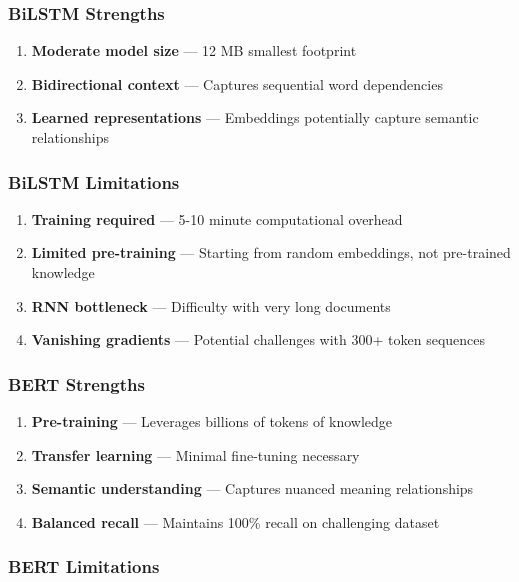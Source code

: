 \subsubsection{BiLSTM Strengths}

\begin{enumerate}
  \item \textbf{Moderate model size} --- 12 MB smallest footprint
  \item \textbf{Bidirectional context} --- Captures sequential word dependencies
  \item \textbf{Learned representations} --- Embeddings potentially capture semantic relationships
\end{enumerate}

\subsubsection{BiLSTM Limitations}

\begin{enumerate}
  \item \textbf{Training required} --- 5-10 minute computational overhead
  \item \textbf{Limited pre-training} --- Starting from random embeddings, not pre-trained knowledge
  \item \textbf{RNN bottleneck} --- Difficulty with very long documents
  \item \textbf{Vanishing gradients} --- Potential challenges with 300+ token sequences
\end{enumerate}

\subsubsection{BERT Strengths}

\begin{enumerate}
  \item \textbf{Pre-training} --- Leverages billions of tokens of knowledge
  \item \textbf{Transfer learning} --- Minimal fine-tuning necessary
  \item \textbf{Semantic understanding} --- Captures nuanced meaning relationships
  \item \textbf{Balanced recall} --- Maintains 100\% recall on challenging dataset
\end{enumerate}

\subsubsection{BERT Limitations}

